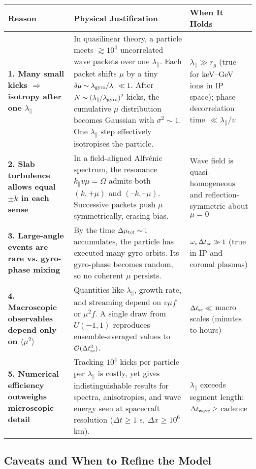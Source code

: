 {\begin{longtable}{@{}p{}p{}p{}@{}}
\toprule
\textbf{Reason} & \textbf{Physical Justification} & \textbf{When It Holds} \\
\midrule
\textbf{1. Many small kicks $\Rightarrow$ isotropy after one $\lambda_\parallel$} &
In quasilinear theory, a particle meets $\gtrsim 10^4$ uncorrelated wave packets over one $\lambda_\parallel$. Each packet shifts $\mu$ by a tiny $\delta\mu \sim \lambda_{\rm gyro}/\lambda_\parallel \ll 1$. After $N \sim (\lambda_\parallel/\lambda_{\rm gyro})^2$ kicks, the cumulative $\mu$ distribution becomes Gaussian with $\sigma^2 \sim 1$. One $\lambda_\parallel$ step effectively isotropises the particle. &
$\lambda_\parallel \gg r_g$ (true for keV–GeV ions in IP space); phase decorrelation time $\ll \lambda_\parallel/v$ \\
\addlinespace
\textbf{2. Slab turbulence allows equal $\pm k$ in each sense} &
In a field-aligned Alfvénic spectrum, the resonance $k_\parallel v\mu = \Omega$ admits both $(k, +\mu)$ and $(–k, –\mu)$. Successive packets push $\mu$ symmetrically, erasing bias. &
Wave field is quasi-homogeneous and reflection-symmetric about $\mu=0$ \\
\addlinespace
\textbf{3. Large-angle events are rare vs. gyro-phase mixing} &
By the time $\Delta \mu_{\rm tot} \sim 1$ accumulates, the particle has executed many gyro-orbits. Its gyro-phase becomes random, so no coherent $\mu$ persists. &
$\omega_c\,\Delta t_{\rm sc} \gg 1$ (true in IP and coronal plasmas) \\
\addlinespace
\textbf{4. Macroscopic observables depend only on $\langle\mu^2\rangle$} &
Quantities like $\lambda_\parallel$, growth rate, and streaming depend on $v\mu f$ or $\mu^2 f$. A single draw from $U(-1,1)$ reproduces ensemble-averaged values to $\mathcal{O}(\Delta t_{\rm sc}^3)$. &
$\Delta t_{\rm sc} \ll$ macro scales (minutes to hours) \\
\addlinespace
\textbf{5. Numerical efficiency outweighs microscopic detail} &
Tracking $10^4$ kicks per particle per $\lambda_\parallel$ is costly, yet gives indistinguishable results for spectra, anisotropies, and wave energy seen at spacecraft resolution ($\Delta t \geq 1$ s, $\Delta x \geq 10^6$ km). &
$\lambda_\parallel$ exceeds segment length; $\Delta t_{\rm wave} \geq$ cadence \\
\bottomrule
\end{longtable}

\subsection*{Caveats and When to Refine the Model}

}
